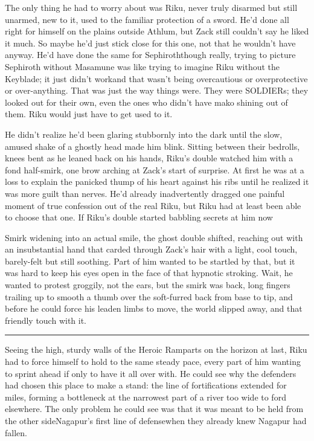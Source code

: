 The only thing he had to worry about was Riku, never truly disarmed but still unarmed, new to it, used to the familiar protection of a sword. He'd done all right for himself on the plains outside Athlum, but Zack still couldn't say he liked it much. So maybe he'd just stick close for this one, not that he wouldn't have anyway. He'd have done the same for Sephiroth\textemdash though really, trying to picture Sephiroth without Masamune was like trying to imagine Riku without the Keyblade; it just didn't work\textemdash and that wasn't being overcautious or overprotective or over-anything. That was just the way things were. They were SOLDIERs; they looked out for their own, even the ones who didn't have mako shining out of them. Riku would just have to get used to it.

He didn't realize he'd been glaring stubbornly into the dark until the slow, amused shake of a ghostly head made him blink. Sitting between their bedrolls, knees bent as he leaned back on his hands, Riku's double watched him with a fond half-smirk, one brow arching at Zack's start of surprise. At first he was at a loss to explain the panicked thump of his heart against his ribs until he realized it was more guilt than nerves. He'd already inadvertently dragged one painful moment of true confession out of the real Riku, but Riku had at least been able to choose that one. If Riku's double started babbling secrets at him now\textemdash 

Smirk widening into an actual smile, the ghost double shifted, reaching out with an insubstantial hand that carded through Zack's hair with a light, cool touch, barely-felt but still soothing. Part of him wanted to be startled by that, but it was hard to keep his eyes open in the face of that hypnotic stroking. Wait, he wanted to protest groggily, not the ears, but the smirk was back, long fingers trailing up to smooth a thumb over the soft-furred back from base to tip, and before he could force his leaden limbs to move, the world slipped away, and that friendly touch with it.

\fancybreak{\pfbreakdisplay}


Seeing the high, sturdy walls of the Heroic Ramparts on the horizon at last, Riku had to force himself to hold to the same steady pace, every part of him wanting to sprint ahead if only to have it all over with. He could see why the defenders had chosen this place to make a stand: the line of fortifications extended for miles, forming a bottleneck at the narrowest part of a river too wide to ford elsewhere. The only problem he could see was that it was meant to be held from the other side\textemdash Nagapur's first line of defense\textemdash when they already knew Nagapur had fallen.

